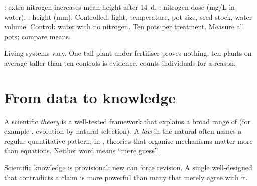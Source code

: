 \begin{example}\label{ex:g10:scientific-biology:fertiliser}
: extra nitrogen increases mean height after \qty{14}{d}.
: nitrogen dose (\unit{mg/L} in water). : height (\unit{mm}). Controlled: light, temperature, pot size,
seed stock, water volume. Control: water with no nitrogen. Ten pots
per treatment. Measure all pots; compare means.
\end{example}

\begin{remark}\label{rem:g10:scientific-biology:replicate}
Living systems vary. One tall plant under fertiliser proves nothing;
ten plants on average taller than ten controls is evidence. 
counts individuals for a reason.
\end{remark}

\section{From data to knowledge}

\begin{definition}\label{def:g10:scientific-biology:theory}
A scientific \emph{theory} is a well-tested
framework that explains a broad range of  (for example , evolution by natural selection). A \emph{law} in the natural  often names a regular quantitative
pattern; in , theories that organise mechanisms matter more than
equations. Neither word means ``mere guess''.
\end{definition}

\begin{proposition}\label{prop:g10:scientific-biology:self-correct}
Scientific knowledge is provisional: new  can force revision.
A single well-designed  that contradicts a claim is more
powerful than many that merely agree with it.
\end{proposition}
\admitted

